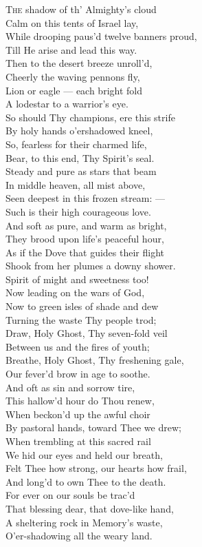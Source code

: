 
\textsc{The} shadow of th’ Almighty’s cloud \\
 Calm on this tents of Israel lay, \\
 While drooping paus’d twelve banners proud, \\
 Till He arise and lead this way. \\
  Then to the desert breeze unroll’d, \\
 Cheerly the waving pennons fly, \\
 Lion or eagle — each bright fold \\
 A lodestar to a warrior’s eye. \\
  So should Thy champions, ere this strife \\
 By holy hands o’ershadowed kneel, \\
 So, fearless for their charmed life, \\
 Bear, to this end, Thy Spirit’s seal. \\
  Steady and pure as stars that beam \\
 In middle heaven, all mist above, \\
 Seen deepest in this frozen stream: — \\
 Such is their high courageous love. \\
  And soft as pure, and warm as bright, \\
 They brood upon life’s peaceful hour, \\
 As if the Dove that guides their flight \\
 Shook from her plumes a downy shower. \\
  Spirit of might and sweetness too! \\
 Now leading on the wars of God, \\
 Now to green isles of shade and dew \\
 Turning the waste Thy people trod; \\
  Draw, Holy Ghost, Thy seven-fold veil \\
 Between us and the fires of youth; \\
 Breathe, Holy Ghost, Thy freshening gale, \\
 Our fever’d brow in age to soothe. \\
  And oft as sin and sorrow tire, \\
 This hallow’d hour do Thou renew, \\
 When beckon’d up the awful choir \\
 By pastoral hands, toward Thee we drew; \\
  When trembling at this sacred rail \\
 We hid our eyes and held our breath, \\
 Felt Thee how strong, our hearts how frail, \\
 And long’d to own Thee to the death. \\
  For ever on our souls be trac’d \\
 That blessing dear, that dove-like hand, \\
 A sheltering rock in Memory’s waste, \\
 O’er-shadowing all the weary land.\\

